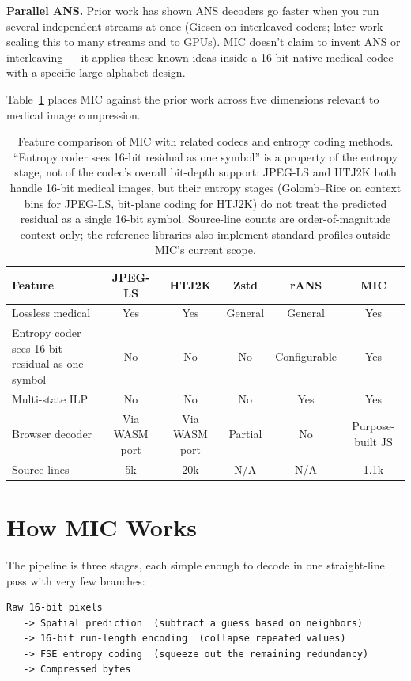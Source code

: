 \documentclass[11pt]{article}
\begin{document}
\textbf{Parallel ANS.} Prior work has shown ANS decoders go faster when you run
several independent streams at once (Giesen on interleaved coders; later
work scaling this to many streams and to GPUs). MIC doesn't claim to invent
ANS or interleaving --- it applies these known ideas inside a 16-bit-native
medical codec with a specific large-alphabet design.

Table~\ref{tab:positioning} places MIC against the prior work across five
dimensions relevant to medical image compression.

\begin{table}[htbp]
\centering
\caption{Feature comparison of MIC with related codecs and entropy coding
methods. ``Entropy coder sees 16-bit residual as one symbol'' is a property
of the entropy stage, not of the codec's overall bit-depth support: JPEG-LS
and HTJ2K both handle 16-bit medical images, but their entropy stages
(Golomb--Rice on context bins for JPEG-LS, bit-plane coding for HTJ2K) do
not treat the predicted residual as a single 16-bit symbol. Source-line
counts are order-of-magnitude context only; the reference libraries also
implement standard profiles outside MIC's current scope.}
\label{tab:positioning}
\footnotesize
\setlength{\tabcolsep}{3pt}
\begin{tabular}{p{3.2cm}ccccc}
\toprule
Feature & JPEG-LS & HTJ2K & Zstd & rANS & MIC \\
\midrule
Lossless medical & Yes & Yes & General & General & Yes \\
Entropy coder sees 16-bit residual as one symbol & No & No & No & Configurable & Yes \\
Multi-state ILP & No & No & No & Yes & Yes \\
Browser decoder & Via WASM port & Via WASM port & Partial & No & Purpose-built JS \\
Source lines & 5k & 20k & N/A & N/A & 1.1k \\
\bottomrule
\end{tabular}
\end{table}

\section{How MIC Works}

The pipeline is three stages, each simple enough to decode in one
straight-line pass with very few branches:

\begin{verbatim}
Raw 16-bit pixels
   -> Spatial prediction  (subtract a guess based on neighbors)
   -> 16-bit run-length encoding  (collapse repeated values)
   -> FSE entropy coding  (squeeze out the remaining redundancy)
   -> Compressed bytes
\end{verbatim}
\end{document}
